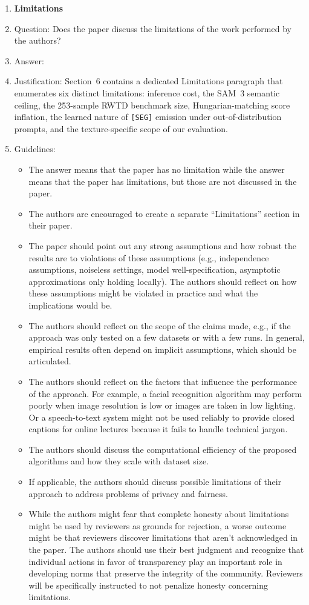 \begin{enumerate}
\item {\bf Limitations}
    \item[] Question: Does the paper discuss the limitations of the work performed by the authors?
    \item[] Answer: \answerYes{}
    \item[] Justification: Section~6 contains a dedicated Limitations paragraph that enumerates six distinct limitations: inference cost, the SAM~3 semantic ceiling, the 253-sample RWTD benchmark size, Hungarian-matching score inflation, the learned nature of \texttt{[SEG]} emission under out-of-distribution prompts, and the texture-specific scope of our evaluation.
    \item[] Guidelines:
    \begin{itemize}
        \item The answer \answerNA{} means that the paper has no limitation while the answer \answerNo{} means that the paper has limitations, but those are not discussed in the paper.
        \item The authors are encouraged to create a separate ``Limitations'' section in their paper.
        \item The paper should point out any strong assumptions and how robust the results are to violations of these assumptions (e.g., independence assumptions, noiseless settings, model well-specification, asymptotic approximations only holding locally). The authors should reflect on how these assumptions might be violated in practice and what the implications would be.
        \item The authors should reflect on the scope of the claims made, e.g., if the approach was only tested on a few datasets or with a few runs. In general, empirical results often depend on implicit assumptions, which should be articulated.
        \item The authors should reflect on the factors that influence the performance of the approach. For example, a facial recognition algorithm may perform poorly when image resolution is low or images are taken in low lighting. Or a speech-to-text system might not be used reliably to provide closed captions for online lectures because it fails to handle technical jargon.
        \item The authors should discuss the computational efficiency of the proposed algorithms and how they scale with dataset size.
        \item If applicable, the authors should discuss possible limitations of their approach to address problems of privacy and fairness.
        \item While the authors might fear that complete honesty about limitations might be used by reviewers as grounds for rejection, a worse outcome might be that reviewers discover limitations that aren't acknowledged in the paper. The authors should use their best judgment and recognize that individual actions in favor of transparency play an important role in developing norms that preserve the integrity of the community. Reviewers will be specifically instructed to not penalize honesty concerning limitations.
    \end{itemize}


\end{enumerate}
